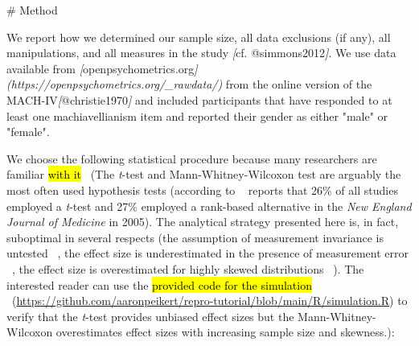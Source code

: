 \documentclass[psych,tutorial,accept,moreauthors,pdftex]{Definitions/mdpi}
\newenvironment{Shaded}{\begin{snugshade}}{\end{snugshade}}
\newcommand{\CommentTok}[1]{\textcolor[rgb]{0.56,0.35,0.01}{\textit{#1}}}
\newcommand{\FunctionTok}[1]{\textcolor[rgb]{0.00,0.00,0.00}{#1}}
\newcommand{\NormalTok}[1]{#1}
\newcommand{\OtherTok}[1]{\textcolor[rgb]{0.56,0.35,0.01}{#1}}
\begin{document}
\nointerlineskip
\begin{adjustwidth}{0.5cm}{0cm} 
\begin{Shaded}
\begin{Highlighting}[]
\FunctionTok{\# Method}

\NormalTok{We report how we determined our sample size, all data exclusions (if any), all}
\NormalTok{manipulations, and all measures in the study }\CommentTok{[}\OtherTok{cf. @simmons2012}\CommentTok{]}\NormalTok{. We use data}
\NormalTok{available from }\CommentTok{[}\OtherTok{openpsychometrics.org}\CommentTok{](https://openpsychometrics.org/\_rawdata/)}
\NormalTok{from the online version of the MACH{-}IV}\CommentTok{[}\OtherTok{@christie1970}\CommentTok{]}\NormalTok{ and included participants}
\NormalTok{that have responded to at least one machiavellianism item and reported their}
\NormalTok{gender as either "male" or "female".}
\end{Highlighting}
\end{Shaded}
\end{adjustwidth}
\begin{paracol}{2}
\switchcolumn


We choose the following statistical procedure because many researchers
are familiar \hl{with it}
~(The \emph{t}-test and Mann-Whitney-Wilcoxon test
  are arguably the most often used hypothesis tests (according to
 ~\citep{fagerlandTtestsNonparametricTests2012, hortonStatisticalMethodsJournal2005}
  reports that 26\% of all studies employed a \emph{t}-test and 27\% employed a
  rank-based alternative in the \emph{New England Journal of Medicine}
  in 2005). The analytical strategy presented here is, in fact,
  suboptimal in several respects (the assumption of measurement
  invariance is untested
 ~\citep{putnickMeasurementInvarianceConventions2016}, the effect size
  is underestimated in the presence of measurement error
 ~\citep{frostCorrectingRegressionDilution2000}, the effect size is
  overestimated for highly skewed distributions
 ~\citep{stonehouseRobustnessTestsCombined1998}). The interested reader
  can use the \hl{provided code for the simulation}
~\mbox{(\url{https://github.com/aaronpeikert/repro-tutorial/blob/main/R/simulation.R})} to verify that the \emph{t}-test provides unbiased
  effect sizes but the Mann-Whitney-Wilcoxon overestimates effect sizes
  with increasing sample size and skewness.):

\vspace{+6pt}
\end{paracol}
\end{document}
